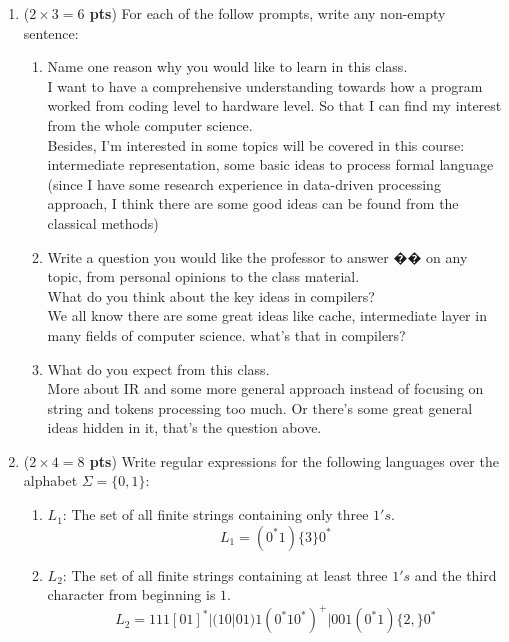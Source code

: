 \documentclass[10pt]{article}
\newcommand {\pts}[1]{({\bf #1 pts})}
\begin{document}
\begin{enumerate}
  \item \pts{$2\times 3=6$} For each of the follow prompts, write any non-empty sentence:
  \begin{enumerate}
           \item Name one reason why you would like to learn in this class.
           \\
            I want to have a comprehensive understanding towards how a program
            worked from coding level to hardware level. So that I can find my
            interest from the whole computer science. \\
            Besides, I'm interested in some topics will be covered
            in this course: intermediate representation, some basic ideas to
            process formal language (since I have some research experience in
            data-driven processing approach, I think there are some good ideas
            can be found from the classical methods)
           \item Write a question you would like the professor to answer �� on any topic, from personal opinions to the class material.
            \\
            What do you think about the key ideas in compilers?\\
            We all know there are some great ideas like cache, intermediate layer in many fields of computer science.
            what's that in compilers?
           \item What do you expect from this class.
           \\
           More about IR and some more general approach instead of focusing on
           string and tokens processing too much. Or there's some great general
           ideas hidden in it, that's the question above.
  \end{enumerate}
  \item \pts{$2\times 4=8$} Write regular expressions for the following languages over the alphabet $\Sigma=\{0,1\}$:
 \begin{enumerate}
           \item $L_1$: The set of all finite strings containing only three $1's$.
            \[
            L_1 = (0^*1)\{3\}0^*
            \]
           \item $L_2$: The set of all finite strings containing at least three $1's$ and the third character from beginning is $1$.
            \[
            L_2 = 111[01]^*|(10|01)1(0^*10^*)^+|001(0^*1)\{2,\}0^*
\]
\end{enumerate}
\end{enumerate}
\end{document}
